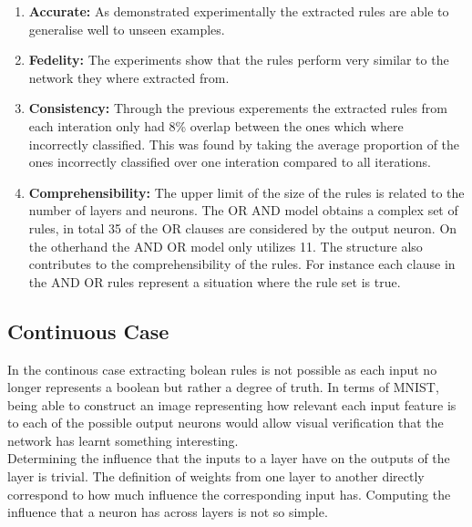 \begin{enumerate}
	\item \textbf{Accurate:} As demonstrated experimentally the extracted rules are able to generalise well to unseen examples.
	\item \textbf{Fedelity:} The experiments show that the rules perform very similar to the network they where extracted from.
	\item \textbf{Consistency:} Through the previous experements the extracted rules from each interation only had 8\% overlap between the ones which where incorrectly classified. This was found by taking the average proportion of the ones incorrectly classified over one interation compared to all iterations.
	\item \textbf{Comprehensibility:} The upper limit of the size of the rules is related to the number of layers and neurons. The OR AND model obtains a complex set of rules, in total 35 of the OR clauses are considered by the output neuron. On the otherhand the AND OR model only utilizes 11. The structure also contributes to the comprehensibility of the rules. For instance each clause in the AND OR rules represent a situation where the rule set is true.
\end{enumerate}

\subsection{Continuous Case}
In the continous case extracting bolean rules is not possible as each input no longer represents a boolean but rather a degree of truth. In terms of MNIST, being able to construct an image representing how relevant each input feature is to each of the possible output neurons would allow visual verification that the network has learnt something interesting.\\

Determining the influence that the inputs to a layer have on the outputs of the layer is trivial. The definition of weights from one layer to another directly correspond to how much influence the corresponding input has. Computing the influence that a neuron has across layers is not so simple.

